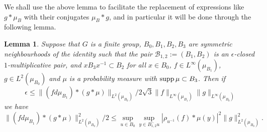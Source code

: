 \documentclass[12pt]{amsart}
\numberwithin{equation}{section}
\theoremstyle{plain}
\newtheorem{lemma}[subsection]{Lemma}
\theoremstyle{definition}
\renewcommand{\leq}{\leqslant}
\providecommand{\supp}{\mathop{\rm supp}\nolimits}
\begin{document}
We shall use the above lemma to facilitate the replacement of expressions like $g \ast \mu_B$ with their conjugates $\mu_B \ast g$, and in particular it will be done through the following lemma.
\begin{lemma}\label{lem.apnormcalc}
Suppose that $G$ is a finite group, $B_0,B_1,B_2,B_3$ are symmetric neighbourhoods of the identity such that the pair $\mathcal{B}_{1,2}:=(B_1,B_2)$ is an $\epsilon$-closed $1$-multiplicative pair, and $xB_3x^{-1} \subset B_2$ for all $x \in B_0$, $f \in L^\infty(\mu_{B_1})$, $g \in L^2(\mu_{B_0})$ and $\mu$ is a probability measure with $\supp \mu \subset B_3$. Then if
\begin{equation*}
\epsilon \leq \|(fd\mu_{B_1}) \ast (g \ast \mu)\|_{L^2(\mu_{B_0})}/2\sqrt{3}\|f\|_{L^\infty(\mu_{B_1})}\|g\|_{L^\infty(\mu_{B_0})}
\end{equation*}
we have
\begin{equation*}
\|(fd\mu_{B_1}) \ast (g \ast \mu)\|_{L^2(\mu_{B_0})}^2/2 \leq \sup_{u \in {B_0}}{\sup_{y \in B_{1,2}^-u}{|\rho_{u^{-1}}(f) \ast \mu(y)|^2}}\|g\|_{L^2(\mu_{B_0})}^2.
\end{equation*}
\end{lemma}
\end{document}
